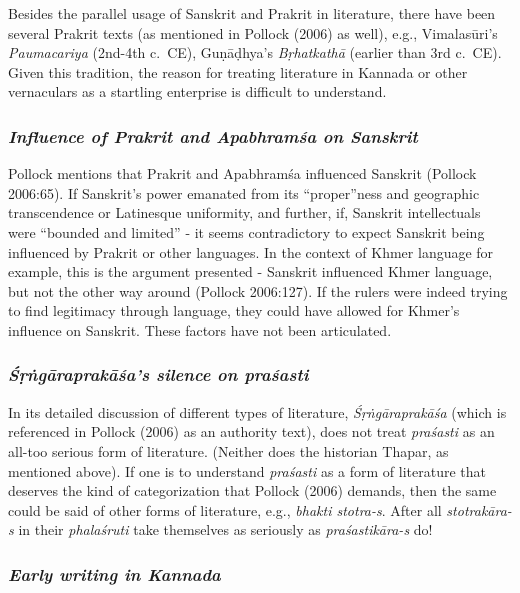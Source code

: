 Besides the parallel usage of Sanskrit and Prakrit in literature, there have been several Prakrit texts (as mentioned in Pollock (2006) as well), e.g., Vimalasūri’s {\sl Paumacariya} (2nd-4th c.\ CE), Guṇāḍhya’s {\sl Bṛhatkathā} (earlier than 3rd c.\ CE). Given this tradition, the reason for treating literature in Kannada or other vernaculars as a startling enterprise is difficult to understand.

\subsubsection{{\sl Influence of Prakrit and Apabhramśa on Sanskrit}}

Pollock mentions that Prakrit and Apabhramśa influenced Sanskrit (Pollock 2006:65). If Sanskrit’s power emanated from its “proper”ness and geographic transcendence or Latinesque uniformity, and further, if, Sanskrit intellectuals were “bounded and limited” - it seems contradictory to expect Sanskrit being influenced by Prakrit or other languages. In the context of Khmer language for example, this is the argument presented - Sanskrit influenced Khmer language, but not the other way around (Pollock 2006:127). If the rulers were indeed trying to find legitimacy through language, they could have allowed for Khmer’s influence on Sanskrit. These factors have not been articulated. 

\subsubsection{{\sl Śṛṅgāraprakāśa’s silence on praśasti}}

In its detailed discussion of different types of literature, {\sl Śṛṅgāraprakāśa} (which is referenced in Pollock (2006) as an authority text), does not treat {\sl praśasti} as an all-too serious form of literature. (Neither does the historian Thapar, as mentioned above). If one is to understand {\sl praśasti} as a form of literature that deserves the kind of categorization that Pollock (2006) demands, then the same could be said of other forms of literature, e.g., {\sl bhakti stotra-s}. After all {\sl stotrakāra-s} in their {\sl phalaśruti} take themselves as seriously as {\sl praśastikāra-s} do! 
\vskip -10pt


\subsubsection {{\sl Early writing in Kannada}}
\vskip -4pt


